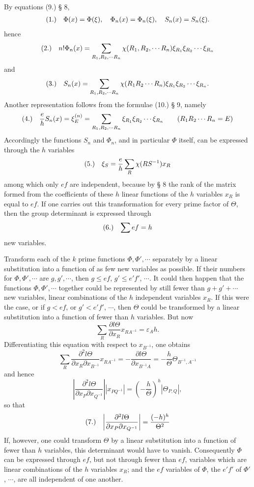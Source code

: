 \documentclass[11pt]{article}
\makeatletter
\newcommand{\frobtag}[2]{\[\begin{array}{@{}r@{\quad}l@{}}\textup{(#1)} & \displaystyle #2\end{array}\]}
\newcommand{\frobtagc}[2]{\[\begin{array}{@{}r@{\quad}c@{}}\textup{(#1)} & \displaystyle #2\end{array}\]}
\makeatother
\begin{document}
By equations (9.) § 8,
\frobtagc{1.}{\Phi(x)=\Phi(\xi),\quad \Phi_n(x)=\Phi_n(\xi),\quad S_n(x)=S_n(\xi).}
hence
\frobtag{2.}{n!\Phi_n(x)=\sum_{R_1,R_2,\cdots R_n}\chi(R_1,R_2,\cdots R_n)\xi_{R_1}\xi_{R_2}\cdots\xi_{R_n}}
and
\frobtag{3.}{S_n(x)=\sum_{R_1,R_2,\cdots R_n}\chi(R_1R_2\cdots R_n)\xi_{R_1}\xi_{R_2}\cdots\xi_{R_n}.}
Another representation follows from the formulae (10.) § 9, namely
\frobtag{4.}{\frac{e}{h}S_n(x)=\xi_E^{(n)}=\sum_{R_1,R_2,\cdots R_n}\xi_{R_1}\xi_{R_2}\cdots\xi_{R_n}\qquad (R_1R_2\cdots R_n=E)}
Accordingly the functions $S_n$ and $\Phi_n$, and in particular $\Phi$ itself, can be expressed through the $h$ variables
\frobtagc{5.}{\xi_S=\frac{e}{h}\sum_R\chi(RS^{-1})x_R}
among which only $ef$ are independent, because by § 8 the rank of the matrix formed from the coefficients of these $h$ linear functions of the $h$ variables $x_R$ is equal to $ef$. If one carries out this transformation for every prime factor of $\Theta$, then the group determinant is expressed through
\frobtagc{6.}{\sum ef=h}
new variables.

Transform each of the $k$ prime functions $\Phi,\Phi',\cdots$ separately by a linear substitution into a function of as few new variables as possible. If their numbers for $\Phi,\Phi',\cdots$ are $g,g',\cdots$, then $g\le ef$, $g'\le e'f'$, $\cdots$. It could then happen that the functions $\Phi,\Phi',\cdots$ together could be represented by still fewer than $g+g'+\cdots$ new variables, linear combinations of the $h$ independent variables $x_R$. If this were the case, or if $g<ef$, or $g'<e'f'$, $\cdots$, then $\Theta$ could be transformed by a linear substitution into a function of fewer than $h$ variables. But now
\[
\sum_R\frac{\partial l\Theta}{\partial x_R}x_{RA^{-1}}=\varepsilon_A h.
\]
Differentiating this equation with respect to $x_{B^{-1}}$, one obtains
\[
\sum_R\frac{\partial^2 l\Theta}{\partial x_R\partial x_{B^{-1}}}x_{RA^{-1}}=-\frac{\partial l\Theta}{\partial x_{B^{-1}A}}=-\frac{h}{\Theta}\Theta_{B^{-1},A^{-1}}
\]
and hence
\[
\left|\frac{\partial^2 l\Theta}{\partial x_P\partial x_{Q^{-1}}}\right|\left|x_{PQ^{-1}}\right|=\left(-\frac{h}{\Theta}\right)^h\left|\Theta_{P,Q}\right|,
\]
so that
\frobtagc{7.}{\left|\frac{\partial^2 l\Theta}{\partial x_P\partial x_{Q^{-1}}}\right|=\frac{(-h)^h}{\Theta^2}}
If, however, one could transform $\Theta$ by a linear substitution into a function of fewer than $h$ variables, this determinant would have to vanish. Consequently $\Phi$ can be expressed through $ef$, but not through fewer than $ef$, variables which are linear combinations of the $h$ variables $x_R$; and the $ef$ variables of $\Phi$, the $e'f'$ of $\Phi'$, $\cdots$, are all independent of one another.
\end{document}
